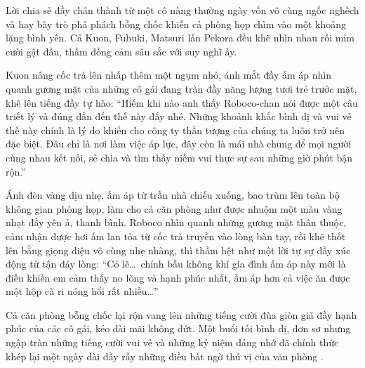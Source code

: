 \documentclass[../main.tex]{subfiles}
\begin{document}
Lời chia sẻ đầy chân thành từ một cô nàng thường ngày vốn vô cùng ngốc nghếch và hay bày trò phá phách bỗng chốc khiến cả phòng họp chìm vào một khoảng lặng bình yên. Cả Kuon, Fubuki, Matsuri lẫn Pekora đều khẽ nhìn nhau rồi mỉm cười gật đầu, thầm đồng cảm sâu sắc với suy nghĩ ấy.

Kuon nâng cốc trà lên nhấp thêm một ngụm nhỏ, ánh mắt đầy ấm áp nhìn quanh gương mặt của những cô gái đang tràn đầy năng lượng tươi trẻ trước mặt, khẽ lên tiếng đầy tự hào: ``Hiếm khi nào anh thấy Roboco-chan nói được một câu triết lý và đúng đắn đến thế này đấy nhé. Những khoảnh khắc bình dị và vui vẻ thế này chính là lý do khiến cho công ty thần tượng của chúng ta luôn trở nên đặc biệt. Đâu chỉ là nơi làm việc áp lực, đây còn là mái nhà chung để mọi người cùng nhau kết nối, sẻ chia và tìm thấy niềm vui thực sự sau những giờ phút bận rộn.''

Ánh đèn vàng dịu nhẹ, ấm áp từ trần nhà chiếu xuống, bao trùm lên toàn bộ không gian phòng họp, làm cho cả căn phòng như được nhuộm một màu vàng nhạt đầy yên ả, thanh bình. Roboco nhìn quanh những gương mặt thân thuộc, cảm nhận được hơi ấm lan tỏa từ cốc trà truyền vào lòng bàn tay, rồi khẽ thốt lên bằng giọng điệu vô cùng nhẹ nhàng, thì thầm hệt như một lời tự sự đầy xúc động từ tận đáy lòng: ``Có lẽ\dots\ chính bầu không khí gia đình ấm áp này mới là điều khiến em cảm thấy no lòng và hạnh phúc nhất, ấm áp hơn cả việc ăn được một hộp cà ri nóng hổi rất nhiều\dots''

Cả căn phòng bỗng chốc lại rộn vang lên những tiếng cười đùa giòn giã đầy hạnh phúc của các cô gái, kéo dài mãi không dứt. Một buổi tối bình dị, đơn sơ nhưng ngập tràn những tiếng cười vui vẻ và những kỷ niệm đáng nhớ đã chính thức khép lại một ngày dài đầy rẫy những điều bất ngờ thú vị của văn phòng \hll.
\end{document}
